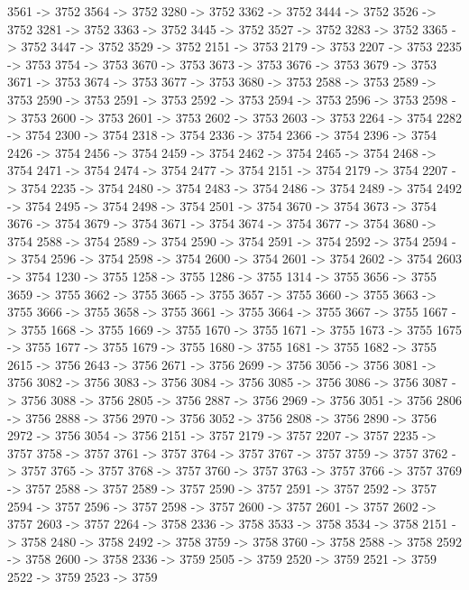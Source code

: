 {	3561 -> 3752
	3564 -> 3752
	3280 -> 3752
	3362 -> 3752
	3444 -> 3752
	3526 -> 3752
	3281 -> 3752
	3363 -> 3752
	3445 -> 3752
	3527 -> 3752
	3283 -> 3752
	3365 -> 3752
	3447 -> 3752
	3529 -> 3752
	2151 -> 3753
	2179 -> 3753
	2207 -> 3753
	2235 -> 3753
	3754 -> 3753
	3670 -> 3753
	3673 -> 3753
	3676 -> 3753
	3679 -> 3753
	3671 -> 3753
	3674 -> 3753
	3677 -> 3753
	3680 -> 3753
	2588 -> 3753
	2589 -> 3753
	2590 -> 3753
	2591 -> 3753
	2592 -> 3753
	2594 -> 3753
	2596 -> 3753
	2598 -> 3753
	2600 -> 3753
	2601 -> 3753
	2602 -> 3753
	2603 -> 3753
	2264 -> 3754
	2282 -> 3754
	2300 -> 3754
	2318 -> 3754
	2336 -> 3754
	2366 -> 3754
	2396 -> 3754
	2426 -> 3754
	2456 -> 3754
	2459 -> 3754
	2462 -> 3754
	2465 -> 3754
	2468 -> 3754
	2471 -> 3754
	2474 -> 3754
	2477 -> 3754
	2151 -> 3754
	2179 -> 3754
	2207 -> 3754
	2235 -> 3754
	2480 -> 3754
	2483 -> 3754
	2486 -> 3754
	2489 -> 3754
	2492 -> 3754
	2495 -> 3754
	2498 -> 3754
	2501 -> 3754
	3670 -> 3754
	3673 -> 3754
	3676 -> 3754
	3679 -> 3754
	3671 -> 3754
	3674 -> 3754
	3677 -> 3754
	3680 -> 3754
	2588 -> 3754
	2589 -> 3754
	2590 -> 3754
	2591 -> 3754
	2592 -> 3754
	2594 -> 3754
	2596 -> 3754
	2598 -> 3754
	2600 -> 3754
	2601 -> 3754
	2602 -> 3754
	2603 -> 3754
	1230 -> 3755
	1258 -> 3755
	1286 -> 3755
	1314 -> 3755
	3656 -> 3755
	3659 -> 3755
	3662 -> 3755
	3665 -> 3755
	3657 -> 3755
	3660 -> 3755
	3663 -> 3755
	3666 -> 3755
	3658 -> 3755
	3661 -> 3755
	3664 -> 3755
	3667 -> 3755
	1667 -> 3755
	1668 -> 3755
	1669 -> 3755
	1670 -> 3755
	1671 -> 3755
	1673 -> 3755
	1675 -> 3755
	1677 -> 3755
	1679 -> 3755
	1680 -> 3755
	1681 -> 3755
	1682 -> 3755
	2615 -> 3756
	2643 -> 3756
	2671 -> 3756
	2699 -> 3756
	3056 -> 3756
	3081 -> 3756
	3082 -> 3756
	3083 -> 3756
	3084 -> 3756
	3085 -> 3756
	3086 -> 3756
	3087 -> 3756
	3088 -> 3756
	2805 -> 3756
	2887 -> 3756
	2969 -> 3756
	3051 -> 3756
	2806 -> 3756
	2888 -> 3756
	2970 -> 3756
	3052 -> 3756
	2808 -> 3756
	2890 -> 3756
	2972 -> 3756
	3054 -> 3756
	2151 -> 3757
	2179 -> 3757
	2207 -> 3757
	2235 -> 3757
	3758 -> 3757
	3761 -> 3757
	3764 -> 3757
	3767 -> 3757
	3759 -> 3757
	3762 -> 3757
	3765 -> 3757
	3768 -> 3757
	3760 -> 3757
	3763 -> 3757
	3766 -> 3757
	3769 -> 3757
	2588 -> 3757
	2589 -> 3757
	2590 -> 3757
	2591 -> 3757
	2592 -> 3757
	2594 -> 3757
	2596 -> 3757
	2598 -> 3757
	2600 -> 3757
	2601 -> 3757
	2602 -> 3757
	2603 -> 3757
	2264 -> 3758
	2336 -> 3758
	3533 -> 3758
	3534 -> 3758
	2151 -> 3758
	2480 -> 3758
	2492 -> 3758
	3759 -> 3758
	3760 -> 3758
	2588 -> 3758
	2592 -> 3758
	2600 -> 3758
	2336 -> 3759
	2505 -> 3759
	2520 -> 3759
	2521 -> 3759
	2522 -> 3759
	2523 -> 3759
}
